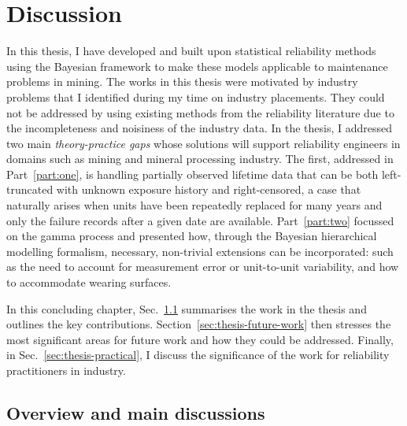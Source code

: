 \chapter{Discussion}\label{chap:chapter7}

In this thesis, I have developed and built upon statistical reliability methods using the Bayesian framework to make these models applicable to maintenance problems in mining. The works in this thesis were motivated by industry problems that I identified during my time on industry placements. They could not be addressed by using existing methods from the reliability literature due to the incompleteness and noisiness of the industry data. In the thesis, I addressed two main \textit{theory-practice gaps} whose solutions will support reliability engineers in domains such as mining and mineral processing industry. The first, addressed in Part~\ref{part:one}, is handling partially observed lifetime data that can be both left-truncated with unknown exposure history and right-censored, a case that naturally arises when units have been repeatedly replaced for many years and only the failure records after a given date are available. Part~\ref{part:two} focussed on the gamma process and presented how, through the Bayesian hierarchical modelling formalism, necessary, non-trivial extensions can be incorporated: such as the need to account for measurement error or unit-to-unit variability, and how to accommodate wearing surfaces.

In this concluding chapter, Sec.~\ref{sec:thesis-summary} summarises the work in the thesis and outlines the key contributions. Section~\ref{sec:thesis-future-work} then stresses the most significant areas for future work and how they could be addressed. Finally, in Sec.~\ref{sec:thesis-practical}, I discuss the significance of the work for reliability practitioners in industry.

\section{Overview and main discussions} \label{sec:thesis-summary}

